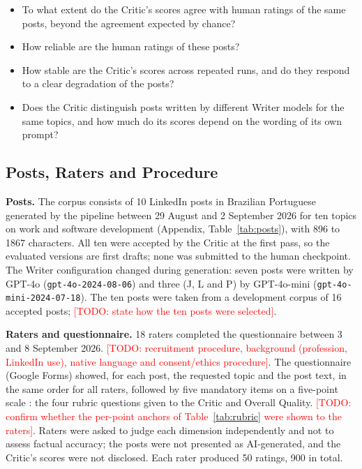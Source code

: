 \documentclass[a4paper,twoside]{article}
\newcommand{\TODO}[1]{\textcolor{red}{[TODO: #1]}}
\newcommand{\NRaters}{18}
\newcommand{\NPosts}{10}
\newcommand{\CharMin}{896}
\newcommand{\CharMax}{1867}
\begin{document}
\begin{itemize}
\item[\textbf{RQ1}] To what extent do the Critic's scores agree with human ratings of the same posts, beyond the agreement expected by chance?
\item[\textbf{RQ2}] How reliable are the human ratings of these posts?
\item[\textbf{RQ3}] How stable are the Critic's scores across repeated runs, and do they respond to a clear degradation of the posts?
\item[\textbf{RQ4}] Does the Critic distinguish posts written by different Writer models for the same topics, and how much do its scores depend on the wording of its own prompt?
\end{itemize}

\subsection{Posts, Raters and Procedure}
\label{sec:setup}

\textbf{Posts.} The corpus consists of \NPosts{} LinkedIn posts in Brazilian Portuguese generated by the pipeline between 29 August and 2 September 2026 for ten topics on work and software development (Appendix, Table~\ref{tab:posts}), with \CharMin{} to \CharMax{} characters. All ten were accepted by the Critic at the first pass, so the evaluated versions are first drafts; none was submitted to the human checkpoint. The Writer configuration changed during generation: seven posts were written by GPT-4o (\texttt{gpt-4o-2024-08-06}) and three (J, L and P) by GPT-4o-mini (\texttt{gpt-4o-mini-2024-07-18}). The ten posts were taken from a development corpus of 16 accepted posts; \TODO{state how the ten posts were selected}.

\textbf{Raters and questionnaire.} \NRaters{} raters completed the questionnaire between 3 and 8 September 2026. \TODO{recruitment procedure, background (profession, LinkedIn use), native language and consent/ethics procedure}. The questionnaire (Google Forms) showed, for each post, the requested topic and the post text, in the same order for all raters, followed by five mandatory items on a five-point scale \cite{likert1932technique,krosnick1999maximizing}: the four rubric questions given to the Critic and Overall Quality. \TODO{confirm whether the per-point anchors of Table~\ref{tab:rubric} were shown to the raters}. Raters were asked to judge each dimension independently and not to assess factual accuracy; the posts were not presented as AI-generated, and the Critic's scores were not disclosed. Each rater produced 50 ratings, 900 in total.
\end{document}
